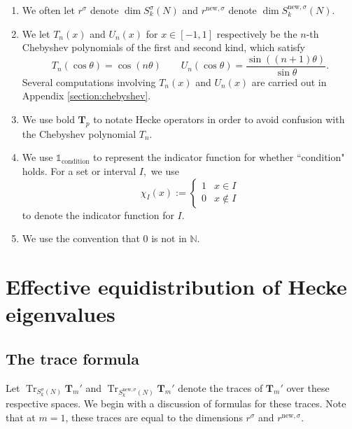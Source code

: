 \documentclass[11pt,letterpaper,reqno]{amsart}
\theoremstyle{definition}
\numberwithin{equation}{section}
\numberwithin{figure}{section}
\numberwithin{table}{section}
\let\subsectiontemp\subsection
\renewcommand{\subsection}[1]{ 
    \subsectiontemp{#1} \hfill\vspace{0.5\linespacing} 
}
\newcommand{\nw}{\mathrm{new}}
\begin{document}
\begin{enumerate}
    \item We often let $r^{\sigma}$ denote $\dim S_k^\sigma(N)$ and $r^{\nw, \sigma}$ denote $\dim S_k^{\nw, \sigma}(N).$
    \item We let $T_n(x)$ and $U_n(x)$ for $x\in[-1,1]$ respectively be the $n$-th Chebyshev polynomials of the first and second kind, which satisfy
    $$T_n(\cos \theta) = \cos(n \theta) \qquad U_n(\cos \theta) = \frac{\sin((n + 1)\theta)}{\sin \theta}.$$
    Several computations involving $T_n(x)$ and $U_n(x)$ are carried out in Appendix \ref{section:chebyshev}.
    \item We use bold $\mathbf{T}_p$ to notate Hecke operators in order to avoid confusion with the Chebyshev polynomial $T_n$.
    \item We use $\mathds{1}_{\text{condition}}$ to represent the indicator function for whether ``condition" holds. 
    For a set or interval $I,$ we use 
    $$\chi_I(x) := \begin{cases}
        1 & x \in I\\
        0 & x \notin I
    \end{cases}$$
    to denote the indicator function for $I.$
    \item We use the convention that $0$ is not in $\mathbb{N}.$
\end{enumerate}



\section{Effective equidistribution of Hecke eigenvalues}
\label{section:proof-of-thm:main-theorem}

\subsection{The trace formula}

Let $\operatorname{Tr}_{S_k^{\sigma}(N)} \mathbf{T}_m'$ and $\operatorname{Tr}_{S_k^{\nw, \sigma}(N)} \mathbf{T}_m'$ denote the traces of $\mathbf{T}_m'$ over these respective spaces. We begin with a discussion of formulas for these traces. Note that at $m=1$, these traces are equal to the dimensions $r^\sigma$ and $r^{\nw, \sigma}.$
\end{document}

